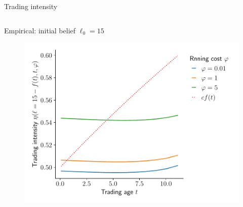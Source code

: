 \documentclass{beamer}
\begin{document}
\begin{frame}[allowframebreaks]{Trading intensity}
\begin{columns}[t]
	\begin{column}{0.49\textwidth}
		\begin{block}{Empirical: initial belief $\ell_0=15$}
			\begin{figure}
				\includegraphics[height=0.407\textheight]{figures/trintgivenlphi15}
			\end{figure}
		\end{block}  
	\end{column}
\end{columns}
\end{frame}
\end{document}

